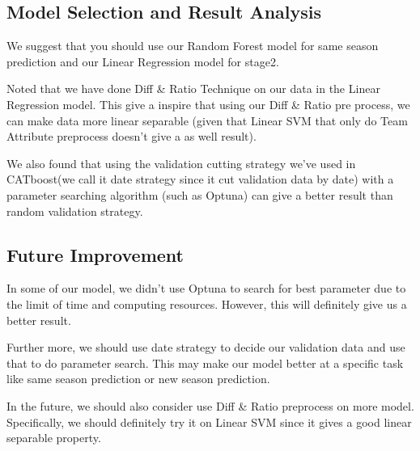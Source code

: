 \subsection*{Model Selection and Result Analysis}
\par We suggest that you should use our Random Forest model for same season prediction and our Linear Regression model for stage2. 
\par Noted that we have done Diff \& Ratio Technique on our data in the Linear Regression model. This give a inspire that using our Diff \& Ratio pre process, we can make data more linear separable (given that Linear SVM that only do Team Attribute preprocess doesn't give a as well result). 
\par We also found that using the validation cutting strategy we've used in CATboost(we call it date strategy since it cut validation data by date) with a parameter searching algorithm (such as Optuna) can give a better result than random validation strategy.

\subsection*{Future Improvement}
\par In some of our model, we didn't use Optuna to search for best parameter due to the limit of time and  computing resources. However, this will definitely give us a better result. 
\par Further more, we should use date strategy to decide our validation data and use that to do parameter search. This may make our model better at a specific task like same season prediction or new season prediction.
\par In the future, we should also consider use Diff \& Ratio preprocess on more model. Specifically, we should definitely try it on Linear SVM since it gives a good linear separable property. 
